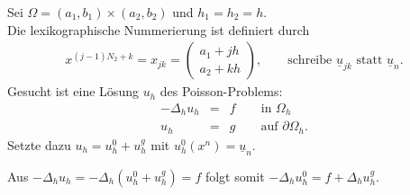 \begin{Beispiel}
    Sei $\Omega = (a_1, b_1) \times (a_2, b_2)$ und $h_1 = h_2 = h$. \\
    Die lexikographische Nummerierung ist definiert durch
    \begin{eqnarray*}
        x^{(j - 1) N_2 + k} = x_{j k} = \begin{pmatrix}
                                          a_1 + jh \\
                                          a_2 + kh
                                        \end{pmatrix},
        \qquad \text{schreibe } \underline u_{j k} \text{ statt }
        \underline u_n.
    \end{eqnarray*}
    Gesucht ist eine Lösung $u_h$ des Poisson-Problems:
    \begin{eqnarray*}
        -\Delta_h u_h &=& f \qquad \text{in } \Omega_h \\
        u_h &=& g \qquad \text{auf } \partial\Omega_h.
    \end{eqnarray*}
    Setzte dazu $u_h = u_h^0 + u_h^g$ mit $u_h^0(x^n) = \underline u_n$.

    Aus $-\Delta_h u_h = -\Delta_h (u_h^0 + u_h^g) = f$ folgt somit
    $-\Delta_h u_h^0 = f + \Delta_h u_h^g$.


\end{Beispiel}
